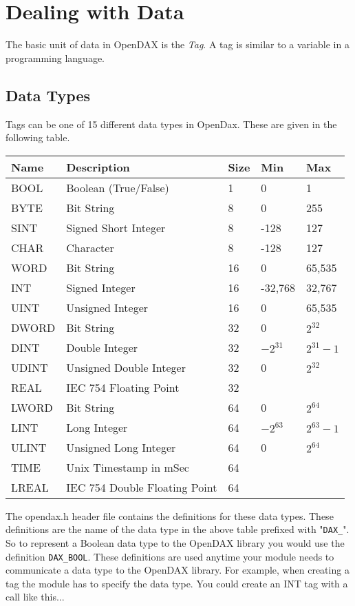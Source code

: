 \chapter{Dealing with Data}
The basic unit of data in OpenDAX is the \textit{Tag}.  A tag is similar to a variable in a programming language.
\section{Data Types}
Tags can be one of 15 different data types in OpenDax.  These are given in the following table.

\begin{tabular}{|l|l|l|l|l|}
\hline \textbf{Name} & \textbf{Description} & \textbf{Size} & \textbf{Min} & \textbf{Max} \\
\hline BOOL & Boolean (True/False) & 1 & 0 & 1 \\
\hline BYTE & Bit String & 8 & 0 & 255 \\
\hline SINT & Signed Short Integer & 8 & -128 & 127 \\
\hline CHAR & Character & 8 & -128 & 127 \\
\hline WORD & Bit String & 16 & 0 & 65,535 \\
\hline INT & Signed Integer & 16 & -32,768 & 32,767 \\
\hline UINT & Unsigned Integer & 16 & 0 & 65,535 \\
\hline DWORD & Bit String & 32 & 0 & $2^{32}$ \\
\hline DINT & Double Integer & 32 & $-2^{31}$ & $2^{31}-1$ \\
\hline UDINT & Unsigned Double Integer & 32 & 0 & $2^{32}$ \\
\hline REAL & IEC 754 Floating Point & 32 &  &  \\
\hline LWORD & Bit String & 64 & 0 & $2^{64}$ \\
\hline LINT & Long Integer & 64 & $-2^{63}$ & $2^{63}-1$ \\
\hline ULINT & Unsigned Long Integer & 64 & 0 & $2^{64}$ \\
\hline TIME & Unix Timestamp in mSec & 64 &  &  \\
\hline LREAL & IEC 754 Double Floating Point & 64 &  &  \\
\hline
\end{tabular}

The opendax.h header file contains the definitions for these data types.  These definitions are the name of the data type in the above table prefixed with "\texttt{DAX\_}".  So to represent a Boolean data type to the OpenDAX library you would use the definition \texttt{DAX\_BOOL}.  These definitions are used anytime your module needs to communicate a data type to the OpenDAX library.  For example, when creating a tag the module has to specify the data type.  You could create an INT tag with a call like this...

